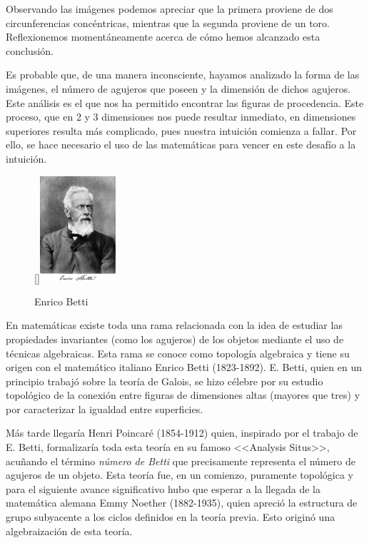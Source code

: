 \documentclass[12pt, a4paper, twoside]{book}
\numberwithin{equation}{section}
\theoremstyle{definition}
\theoremstyle{remark}
\theoremstyle{plain}
\begin{document}
	Observando las imágenes podemos apreciar que la primera proviene de 
	dos circunferencias concéntricas, mientras que la segunda proviene de 
	un toro. Reflexionemos momentáneamente acerca de cómo hemos alcanzado
	esta conclusión.

	Es probable que, de una manera inconsciente, hayamos analizado la 
	forma de las imágenes, el número de agujeros que poseen y 
	la dimensión de dichos agujeros. Este análisis es el que nos ha 
	permitido encontrar las figuras de procedencia. Este proceso, que en 
	2 y 3 dimensiones nos puede resultar inmediato, en dimensiones 
	superiores resulta más complicado, pues nuestra intuición comienza a 
	fallar. Por ello, se hace necesario el uso de las matemáticas para 
	vencer en este desafío a la intuición.

	\begin{figure}
	  \begin{center}
		  \raisebox{16pt}[\dimexpr{}\baselineskip\relax]{\includegraphics[width=0.25\textwidth]{Images/344px-Betti_Enrico.jpg}}
	  \vspace*{-9mm}
	  \caption*{Enrico Betti}
	  \end{center}
	\end{figure}
	
	En matemáticas existe toda una rama 
	relacionada con la idea de estudiar las propiedades invariantes 
	(como los agujeros) de los objetos mediante el uso de técnicas 
	algebraicas. Esta rama se conoce como 
	topología algebraica y tiene su origen con el matemático italiano 
	Enrico Betti (1823-1892). E. Betti, quien en un principio trabajó 
	sobre la teoría de Galois, se hizo célebre por su estudio topológico 
	de la conexión entre figuras de dimensiones altas (mayores que tres) y 
	por caracterizar la igualdad entre superficies.

	Más tarde llegaría Henri Poincaré (1854-1912) quien, inspirado por el 
	trabajo de E. Betti, formalizaría toda 
	esta teoría en su famoso <<Analysis Situs>>, acuñando el término 
	\emph{número de Betti} que precisamente representa el número de 
	agujeros de un objeto. Esta teoría fue, en un comienzo, puramente 
	topológica y para el siguiente avance significativo hubo que esperar 
	a la llegada de la matemática alemana 
	Emmy Noether (1882-1935), quien apreció la estructura de grupo 
	subyacente a los ciclos definidos en la teoría previa. Esto originó 
	una algebraización de esta teoría.
\end{document}
